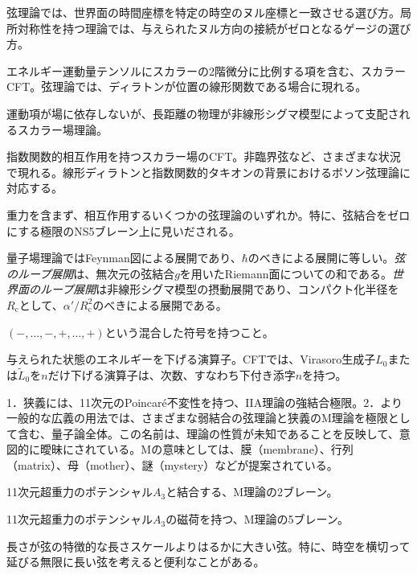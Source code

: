 {弦理論では、世界面の時間座標を特定の時空のヌル座標と一致させる選び方。局所対称性を持つ理論では、与えられたヌル方向の接続がゼロとなるゲージの選び方。}

{エネルギー運動量テンソルにスカラーの2階微分に比例する項を含む、スカラーCFT。弦理論では、ディラトンが位置の線形関数である場合に現れる。}

{運動項が場に依存しないが、長距離の物理が非線形シグマ模型によって支配されるスカラー場理論。}

{指数関数的相互作用を持つスカラー場のCFT。非臨界弦など、さまざまな状況で現れる。線形ディラトンと指数関数的タキオンの背景におけるボソン弦理論に対応する。}

{重力を含まず、相互作用するいくつかの弦理論のいずれか。特に、弦結合をゼロにする極限のNS5ブレーン上に見いだされる。}

{量子場理論ではFeynman図による展開であり、$\hbar$のべきによる展開に等しい。\emph{弦のループ展開}は、無次元の弦結合$g$を用いたRiemann面についての和である。\emph{世界面のループ展開}は非線形シグマ模型の摂動展開であり、コンパクト化半径を$R_{\mathrm c}$として、$\alpha'/R_{\mathrm c}^2$のべきによる展開である。}

{$(-,\ldots,-,+,\ldots,+)$という混合した符号を持つこと。}

{与えられた状態のエネルギーを下げる演算子。CFTでは、Virasoro生成子$L_0$または$\widetilde L_0$を$n$だけ下げる演算子は、次数、すなわち下付き添字$n$を持つ。}

{1．狭義には、11次元のPoincaré不変性を持つ、IIA理論の強結合極限。2．より一般的な広義の用法では、さまざまな弱結合の弦理論と狭義のM理論を極限として含む、量子論全体。この名前は、理論の性質が未知であることを反映して、意図的に曖昧にされている。Mの意味としては、膜（membrane）、行列（matrix）、母（mother）、謎（mystery）などが提案されている。}

{11次元超重力のポテンシャル$A_3$と結合する、M理論の2ブレーン。}

{11次元超重力のポテンシャル$A_3$の磁荷を持つ、M理論の5ブレーン。}

{長さが弦の特徴的な長さスケールよりはるかに大きい弦。特に、時空を横切って延びる無限に長い弦を考えると便利なことがある。}

